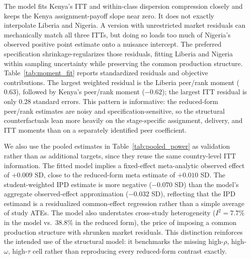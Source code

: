 \documentclass[11pt]{article}
\begin{document}
The model fits Kenya's ITT and within-class dispersion compression closely and keeps the Kenya assignment-payoff slope near zero. It does not exactly interpolate Liberia and Nigeria. A version with unrestricted market residuals can mechanically match all three ITTs, but doing so loads too much of Nigeria's observed positive point estimate onto a nuisance intercept. The preferred specification shrinkage-regularizes those residuals, fitting Liberia and Nigeria within sampling uncertainty while preserving the common production structure. Table~\ref{tab:moment_fit} reports standardized residuals and objective contributions. The largest weighted residual is the Liberia peer/rank moment ($0.63$), followed by Kenya's peer/rank moment ($-0.62$); the largest ITT residual is only $0.28$ standard errors. This pattern is informative: the reduced-form peer/rank estimates are noisy and specification-sensitive, so the structural counterfactuals lean more heavily on the stage-specific assignment, delivery, and ITT moments than on a separately identified peer coefficient.

We also use the pooled estimates in Table~\ref{tab:pooled_power} as validation rather than as additional targets, since they reuse the same country-level ITT information. The fitted model implies a fixed-effect meta-analytic observed effect of $+0.009$ SD, close to the reduced-form meta estimate of $+0.010$ SD. The student-weighted IPD estimate is more negative ($-0.070$ SD) than the model's aggregate observed-effect approximation ($-0.032$ SD), reflecting that the IPD estimand is a residualized common-effect regression rather than a simple average of study ATEs. The model also understates cross-study heterogeneity ($I^2=7.7\%$ in the model vs.\ 38.8\% in the reduced form), the price of imposing a common production structure with shrunken market residuals. This distinction reinforces the intended use of the structural model: it benchmarks the missing high-$\rho$, high-$\omega$, high-$\tau$ cell rather than reproducing every reduced-form contrast exactly.
\end{document}
